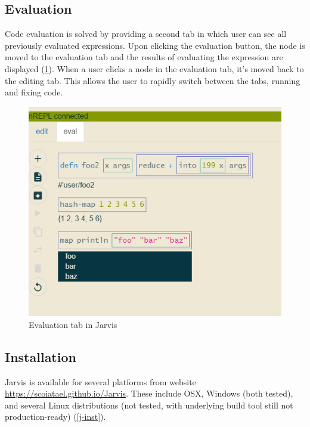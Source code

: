 \documentclass[11pt]{scrartcl}
\begin{document}
\subsection{Evaluation}
Code evaluation is solved by providing a second tab in which user can see all
previously evaluated expressions.
Upon clicking the evaluation button, the node is moved to the evaluation tab and
the results of evaluating the expression are displayed (\ref{j-eval}).
When a user clicks a node in the evaluation tab, it’s moved back to the editing
tab.
This allows the user to rapidly switch between the tabs, running and fixing
code.


\begin{figure}[hbt]
  \includegraphics[scale=0.3]{img/j-eval_f}
  \caption{Evaluation tab in Jarvis}
  \label{j-eval}
\end{figure}

\subsection{Installation}
Jarvis is available for several platforms from website
\url{https://scoiatael.github.io/Jarvis}. These include OSX, Windows (both
tested), and several Linux distributions (not tested, with underlying build tool
still not production-ready) (\ref{j-inst}).
\end{document}
